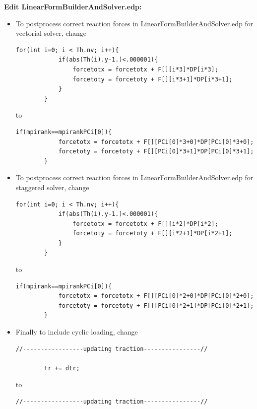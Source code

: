 \textbf{Edit LinearFormBuilderAndSolver.edp:}

\begin{itemize}
	
	\item To postprocess correct reaction forces in LinearFormBuilderAndSolver.edp for vectorial solver, change
	
	\begin{lstlisting}[style=CppStyle]
		for(int i=0; i < Th.nv; i++){
			if(abs(Th(i).y-1.)<.000001){
				forcetotx = forcetotx + F[][i*3]*DP[i*3];           
				forcetoty = forcetoty + F[][i*3+1]*DP[i*3+1];       
			}
		} 
	\end{lstlisting}
	
	to
	
	\begin{lstlisting}[style=CppStyle]
		if(mpirank==mpirankPCi[0]){
			forcetotx = forcetotx + F[][PCi[0]*3+0]*DP[PCi[0]*3+0];
			forcetoty = forcetoty + F[][PCi[0]*3+1]*DP[PCi[0]*3+1]; 
		} 
	\end{lstlisting}
	
	\item To postprocess correct reaction forces in LinearFormBuilderAndSolver.edp for staggered solver, change
	
	\begin{lstlisting}[style=CppStyle]
		for(int i=0; i < Th.nv; i++){
			if(abs(Th(i).y-1.)<.000001){
				forcetotx = forcetotx + F[][i*2]*DP[i*2];           
				forcetoty = forcetoty + F[][i*2+1]*DP[i*2+1];       
			}
		}
	\end{lstlisting}
	
	to
	
	\begin{lstlisting}[style=CppStyle]
		if(mpirank==mpirankPCi[0]){
			forcetotx = forcetotx + F[][PCi[0]*2+0]*DP[PCi[0]*2+0];
			forcetoty = forcetoty + F[][PCi[0]*2+1]*DP[PCi[0]*2+1]; 
		} 
	\end{lstlisting}
	
	\item Finally to include cyclic loading, change
	
	\begin{lstlisting}[style=CppStyle]
		//-----------------updating traction----------------//
		
		tr += dtr; 
	\end{lstlisting}
	
	
	to
	
	\begin{lstlisting}[style=CppStyle]
		//-----------------updating traction----------------//
		

\end{lstlisting}
\end{itemize}
